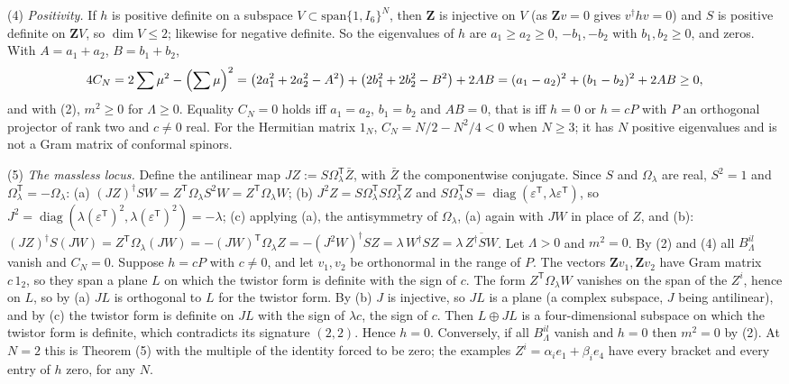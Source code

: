 (4) \emph{Positivity.} If $h$ is positive definite on a subspace $V \subset \mathrm{span}\{1, I_{6}\}^{N}$, then $\mathbf{Z}$ is injective on $V$ (as $\mathbf{Z}v = 0$ gives $v^{\dagger}hv = 0$) and $S$ is positive definite on $\mathbf{Z}V$, so $\dim V \le 2$; likewise for negative definite. So the eigenvalues of $h$ are $a_{1} \ge a_{2} \ge 0$, $-b_{1}, -b_{2}$ with $b_{1}, b_{2} \ge 0$, and zeros. With $A = a_{1} + a_{2}$, $B = b_{1} + b_{2}$,
\[
4C_{N} = 2\sum\mu^{2} - \Bigl(\sum\mu\Bigr)^{2} = \bigl(2a_{1}^{2} + 2a_{2}^{2} - A^{2}\bigr) + \bigl(2b_{1}^{2} + 2b_{2}^{2} - B^{2}\bigr) + 2AB = (a_{1} - a_{2})^{2} + (b_{1} - b_{2})^{2} + 2AB \ge 0,
\]
and with (2), $m^{2} \ge 0$ for $\Lambda \ge 0$. Equality $C_{N} = 0$ holds iff $a_{1} = a_{2}$, $b_{1} = b_{2}$ and $AB = 0$, that is iff $h = 0$ or $h = cP$ with $P$ an orthogonal projector of rank two and $c \ne 0$ real. For the Hermitian matrix $1_{N}$, $C_{N} = N/2 - N^{2}/4 < 0$ when $N \ge 3$; it has $N$ positive eigenvalues and is not a Gram matrix of conformal spinors.

(5) \emph{The massless locus.} Define the antilinear map $J Z := S\Omega_{\lambda}^{\mathsf T}\bar{Z}$, with $\bar{Z}$ the componentwise conjugate. Since $S$ and $\Omega_{\lambda}$ are real, $S^{2} = 1$ and $\Omega_{\lambda}^{\mathsf T} = -\Omega_{\lambda}$: (a) $(JZ)^{\dagger}SW = Z^{\mathsf T}\Omega_{\lambda}S^{2}W = Z^{\mathsf T}\Omega_{\lambda}W$; (b) $J^{2}Z = S\Omega_{\lambda}^{\mathsf T}S\Omega_{\lambda}^{\mathsf T}Z$ and $S\Omega_{\lambda}^{\mathsf T}S = \operatorname{diag}(\varepsilon^{\mathsf T}, \lambda\varepsilon^{\mathsf T})$, so $J^{2} = \operatorname{diag}(\lambda(\varepsilon^{\mathsf T})^{2}, \lambda(\varepsilon^{\mathsf T})^{2}) = -\lambda$; (c) applying (a), the antisymmetry of $\Omega_{\lambda}$, (a) again with $JW$ in place of $Z$, and (b): $(JZ)^{\dagger}S(JW) = Z^{\mathsf T}\Omega_{\lambda}(JW) = -(JW)^{\mathsf T}\Omega_{\lambda}Z = -(J^{2}W)^{\dagger}SZ = \lambda\,W^{\dagger}SZ = \lambda\,\overline{Z^{\dagger}SW}$. Let $\Lambda > 0$ and $m^{2} = 0$. By (2) and (4) all $B^{il}_{\Lambda}$ vanish and $C_{N} = 0$. Suppose $h = cP$ with $c \ne 0$, and let $v_{1}, v_{2}$ be orthonormal in the range of $P$. The vectors $\mathbf{Z}v_{1}, \mathbf{Z}v_{2}$ have Gram matrix $c\,1_{2}$, so they span a plane $L$ on which the twistor form is definite with the sign of $c$. The form $Z^{\mathsf T}\Omega_{\lambda}W$ vanishes on the span of the $Z^{i}$, hence on $L$, so by (a) $JL$ is orthogonal to $L$ for the twistor form. By (b) $J$ is injective, so $JL$ is a plane (a complex subspace, $J$ being antilinear), and by (c) the twistor form is definite on $JL$ with the sign of $\lambda c$, the sign of $c$. Then $L \oplus JL$ is a four-dimensional subspace on which the twistor form is definite, which contradicts its signature $(2,2)$. Hence $h = 0$. Conversely, if all $B^{il}_{\Lambda}$ vanish and $h = 0$ then $m^{2} = 0$ by (2). At $N = 2$ this is Theorem (5) with the multiple of the identity forced to be zero; the examples $Z^{i} = \alpha_{i}e_{1} + \beta_{i}e_{4}$ have every bracket and every entry of $h$ zero, for any $N$.


